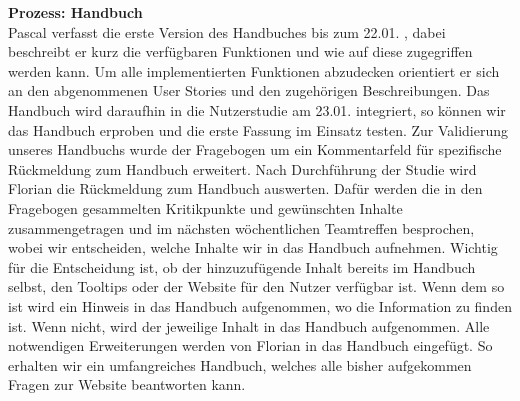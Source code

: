 \documentclass[accentcolor=tud0b,12pt,paper=a4]{tudreport}
\begin{document}
\noindent \textbf{Prozess: Handbuch}\\
Pascal verfasst die erste Version des Handbuches bis zum 22.01. , dabei beschreibt er kurz die verfügbaren Funktionen und wie auf diese zugegriffen werden kann. Um alle implementierten Funktionen abzudecken orientiert er sich an den abgenommenen User Stories und den zugehörigen Beschreibungen. Das Handbuch wird daraufhin in die Nutzerstudie am 23.01. integriert, so können wir das Handbuch erproben und die erste Fassung im Einsatz testen.
Zur Validierung unseres Handbuchs wurde der Fragebogen um ein Kommentarfeld für spezifische Rückmeldung zum Handbuch erweitert. 
Nach Durchführung der Studie wird Florian die Rückmeldung zum Handbuch auswerten. Dafür werden die in den Fragebogen gesammelten Kritikpunkte und gewünschten Inhalte zusammengetragen und im nächsten wöchentlichen Teamtreffen besprochen, wobei wir entscheiden, welche Inhalte wir in das Handbuch aufnehmen. Wichtig für die Entscheidung ist, ob der hinzuzufügende Inhalt bereits im Handbuch selbst, den Tooltips oder der Website für den Nutzer verfügbar ist. Wenn dem so ist wird ein Hinweis in das Handbuch aufgenommen, wo die Information zu finden ist. Wenn nicht, wird der jeweilige Inhalt in das Handbuch aufgenommen. Alle notwendigen Erweiterungen werden von Florian in das Handbuch eingefügt.
So erhalten wir ein umfangreiches Handbuch, welches alle bisher aufgekommen Fragen zur Website beantworten kann.
 
\end{document}
